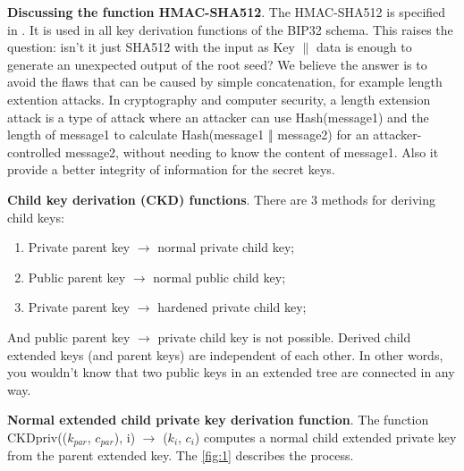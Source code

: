 \bigskip

\textbf{Discussing the function HMAC-SHA512}. The HMAC-SHA512 is specified in \cite{Nystrom2005}. It is used in all key derivation functions of the BIP32 schema.
This raises the question: isn't it just SHA512 with the input as Key $\parallel$ data is enough to generate an unexpected output of the root seed? We believe the answer is to avoid the
flaws that can be caused by simple concatenation, for example length extention attacks. In cryptography and computer security, a length extension attack is a type of attack where an attacker can use Hash(message1) and the length of message1 to calculate Hash(message1 ‖ message2) for an attacker-controlled message2, without needing to know the content of message1.
Also it provide a better integrity of information for the secret keys.


\bigskip
{\textbf{Child key derivation (CKD) functions}}. There are 3 methods for deriving child keys:
\begin{enumerate}
    \item Private parent key $\rightarrow$ normal private child key;
    \item Public parent key $\rightarrow$ normal public child key;
    \item Private parent key $\rightarrow$ hardened private child key;
\end{enumerate}
And public parent key $\rightarrow$ private child key is not possible. Derived child extended keys (and parent keys) are independent of each other. In other words, you wouldn’t know that two public keys in an extended tree are connected in any way.

\bigskip
{\textbf{Normal extended child private key derivation function}}. \label{norm1} The function CKDpriv(($k_{par}$, $c_{par}$), i) $\rightarrow$ ($k_i$, $c_i$) computes a normal child extended private key from the parent extended key.
The \autoref{fig:1} describes the process.

